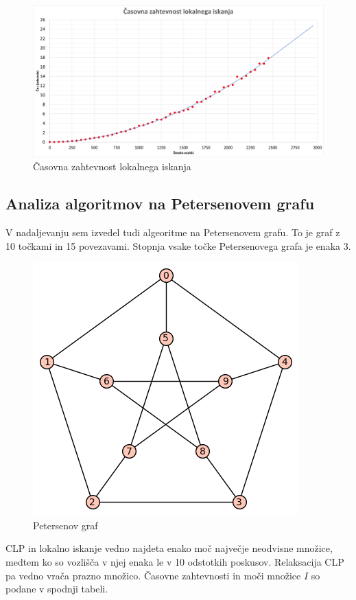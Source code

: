 \documentclass[a4paper, 12 pt]{article}
\theoremstyle{definition}
\theoremstyle{plain}
\theoremstyle{remark}
\begin{document}
\begin{figure}[H]
\centering
  \includegraphics[scale=0.29]{casovna_ zahtevnost_LOKISK.png}
  \caption{Časovna zahtevnost lokalnega iskanja}
  \label{fig:casovna zahtevnost} 
\end{figure}


\subsection{Analiza algoritmov na Petersenovem grafu}
V nadaljevanju sem izvedel tudi algeoritme na Petersenovem grafu. To je graf z 10 točkami in 15 povezavami. Stopnja vsake točke Petersenovega grafa je enaka 3.


\begin{figure}[H]
\centering
  \includegraphics[scale=0.35]{Petersenov graf.png}
  \caption{Petersenov graf}
\end{figure}

CLP in lokalno iskanje vedno najdeta enako moč največje neodvisne množice, medtem ko so vozlišča v njej enaka le v 10 odstotkih poskusov. Relaksacija CLP pa vedno vrača prazno množico. Časovne zahtevnosti in moči množice $I$ so podane v spodnji tabeli.
\end{document}
